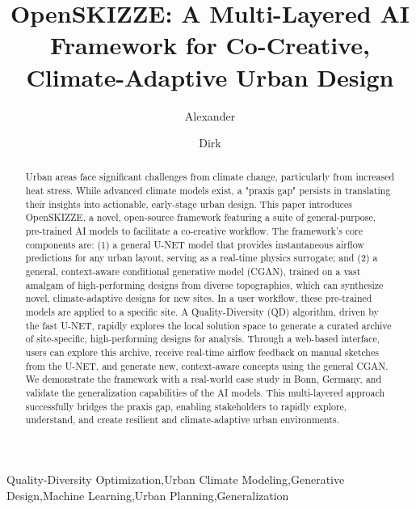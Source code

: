 \documentclass[times,final]{elsarticle}
\begin{document}
	
	
\begin{frontmatter}

\title{OpenSKIZZE: A Multi-Layered AI Framework for Co-Creative, Climate-Adaptive Urban Design}

\author[1]{Alexander }
\author[1,2]{Dirk }

\address[1]{Institute of Technology, Resource and Energy-Efficient Engineering, Bonn-Rhein-Sieg University of Applied Sciences, Sankt Augustin, Germany}
\address[2]{Fraunhofer Institute for Algorithms and Scientific Computing (SCAI), Sankt Augustin, Germany}



\begin{abstract}
Urban areas face significant challenges from climate change, particularly from increased heat stress. While advanced climate models exist, a "praxis gap" persists in translating their insights into actionable, early-stage urban design. This paper introduces OpenSKIZZE, a novel, open-source framework featuring a suite of general-purpose, pre-trained AI models to facilitate a co-creative workflow. The framework's core components are: (1) a general U-NET model that provides instantaneous airflow predictions for any urban layout, serving as a real-time physics surrogate; and (2) a general, context-aware conditional generative model (CGAN), trained on a vast amalgam of high-performing designs from diverse topographies, which can synthesize novel, climate-adaptive designs for new sites. In a user workflow, these pre-trained models are applied to a specific site. A Quality-Diversity (QD) algorithm, driven by the fast U-NET, rapidly explores the local solution space to generate a curated archive of site-specific, high-performing designs for analysis. Through a web-based interface, users can explore this archive, receive real-time airflow feedback on manual sketches from the U-NET, and generate new, context-aware concepts using the general CGAN. We demonstrate the framework with a real-world case study in Bonn, Germany, and validate the generalization capabilities of the AI models. This multi-layered approach successfully bridges the praxis gap, enabling stakeholders to rapidly explore, understand, and create resilient and climate-adaptive urban environments.
\end{abstract}

\begin{keyword}
	\KWD Quality-Diversity Optimization\sep Urban Climate Modeling\sep Generative Design\sep Machine Learning\sep Urban Planning\sep Generalization
\end{keyword}

\end{frontmatter}
\end{document}
